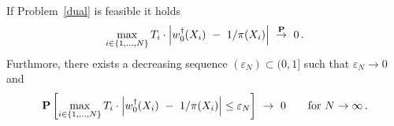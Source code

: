 \begin{theorem}
  \label{th:max_weight_cons}
  If Problem~\ref{dual} is feasible it holds
  \begin{align*}
    \max_{i\in \left\{ 1,\ldots,N \right\}}
    T_i\cdot
    \left| 
  w_0^\dagger(X_i)
  \ 
  -
  \ 
  1/\pi(X_i)
    \right|
  \ 
  \overset{\P}{\to}
  \ 
  0
  \,.
  \end{align*}
  Furthmore, there exists a decreasing sequence $(\varepsilon_N)\subset(0,1]$ such that $\varepsilon_N\to 0$ and 
  \begin{gather*}
    \P
    \left[ 
    \max_{i\in \left\{ 1,\ldots,N \right\}}
    T_i\cdot
    \left| 
  w_0^\dagger(X_i)
  \ 
  -
  \ 
  1/\pi(X_i)
    \right|
    \le
    \varepsilon_N
    \right]
  \  
  \to
  \  
  0
  \qquad
  \text{for}
  \ 
  N\to\infty
  \,.
  \end{gather*}
\end{theorem}
